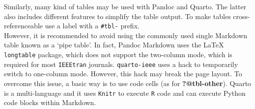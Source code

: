 \documentclass[
  journal,
]{IEEEtran}%
\theoremstyle{plain}
\theoremstyle{remark}
\begin{document}
Similarly, many kind of tables may be used with Pandoc and Quarto. The
latter also includes different features to simplify the table output. To
make tables cross-referenceable use a label with a \texttt{\#tbl-}
prefix.\\
However, it is recommended to avoid using the commonly used single
Markdown table known as a `pipe table'. In fact, Pandoc Markdown uses
the {\LaTeX} \texttt{longtable} package, which does not support the
two-column mode, which is required for most \texttt{IEEEtran} journals.
\texttt{quarto-ieee} uses a hack to temporarily switch to one-column
mode. However, this hack may break the page layout. To overcome this
issue, a basic way is to use code cells (as for \textbf{?@tbl-other}).
Quarto is a multi-language and it uses \texttt{Knitr} to execute
\texttt{R} code and can execute Python code blocks within Markdown.

\begin{table}

\caption{\label{tbl-panel}Main Caption}

\begin{minipage}{0.50\linewidth}



\end{minipage}%
%
\begin{minipage}{0.50\linewidth}



\end{minipage}%

\end{table}%
\end{document}
